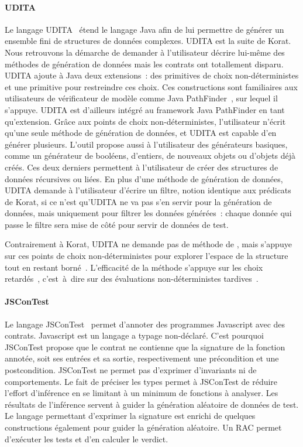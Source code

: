 \paragraph{UDITA} Le langage UDITA~ étend le langage Java
afin de lui permettre de générer un ensemble fini de structures de données
complexes. UDITA est la suite de Korat. Nous retrouvons la démarche de demander
à l'utilisateur décrire lui-même des méthodes de génération de données mais les
contrats ont totallement disparu. UDITA ajoute à Java deux extensions~: des
primitives de choix non-déterministes et une primitive pour restreindre ces
choix. Ces constructions sont familiaires aux utilisateurs de vérificateur de
modèle comme Java PathFinder~, sur lequel il s'appuye. UDITA
est d'ailleurs intégré au framework Java PathFinder en tant qu'extension. Grâce
aux points de choix non-déterministes, l'utilisateur n'écrit qu'une seule
méthode de génération de données, et UDITA est capable d'en générer plusieurs.
L'outil propose aussi à l'utilisateur des générateurs basiques, comme un
générateur de booléens, d'entiers, de nouveaux objets ou d'objets déjà créés.
Ces deux derniers permettent à l'utilisateur de créer des structures de données
récursives ou liées. En plus d'une méthode de génération de données, UDITA
demande à l'utilisateur d'écrire un filtre, notion identique aux prédicats de
Korat, si ce n'est qu'UDITA ne va pas s'en servir pour la génération de données,
mais uniquement pour filtrer les données générées~: chaque donnée qui passe le
filtre sera mise de côté pour servir de données de test.

Contrairement à Korat, UDITA ne demande pas de méthode de
, mais s'appuye sur ces points de choix
non-déterministes pour explorer l'espace de la structure tout en restant
borné~. L'efficacité de la méthode s'appuye
sur les choix retardés~, c'est~à~dire sur des évaluations
non-déterministes tardives~.

\paragraph{JSConTest} Le langage JSConTest~ permet d'annoter
des programmes Javascript avec des contrats. Javascript est un langage a typage
non-déclaré.  C'est pourquoi JSConTest propose que le contrat ne contienne que
la signature de la fonction annotée, soit ses entrées et sa sortie,
respectivement une précondition et une postcondition. JSConTest ne permet pas
d'exprimer d'invariants ni de comportements. Le fait de préciser les types
permet à JSConTest de réduire l'effort d'inférence en se limitant à un minimum
de fonctions à analyser. Les résultats de l'inférence servent à guider la
génération aléatoire de données de test. Le langage permettant d'exprimer la
signature est enrichi de quelques constructions également pour guider la
génération aléatoire. Un RAC permet d'exécuter les tests et d'en calculer le
verdict.

